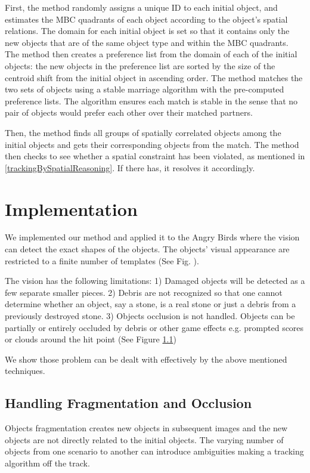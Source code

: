 \documentclass[letterpaper]{article}
\begin{document}
First, the method randomly assigns a unique ID to each initial object, and estimates the MBC quadrants of each object according to the object's spatial relations. The domain for each initial object is set so that it contains only the new objects that are of the same object type and within the MBC quadrants. The method then creates a preference list from the domain of each of the initial objects: the new objects in the preference list are sorted by the size of the centroid shift from the initial object in ascending order. The method matches the two sets of objects using a stable marriage algorithm with the pre-computed preference lists. The algorithm ensures each match is stable in the sense that no pair of objects would prefer each other over their matched partners. 

Then, the method finds all groups of spatially correlated objects among the initial objects and gets their corresponding objects from the match. The method then checks to see whether a spatial constraint has been violated, as mentioned in \ref{trackingBySpatialReasoning}. If there has, it resolves it accordingly.

 

\section{Implementation}
We implemented our method and applied it to the Angry Birds where the vision can detect the exact shapes of the objects\cite{}. The objects' visual appearance are restricted to a finite number of templates (See Fig. ).

The vision has the following limitations: 1) Damaged objects will be detected as a few separate smaller pieces. 2) Debris are not recognized so that one cannot determine whether an object, say a stone, is a real stone or just a debris from a previously destroyed stone. 3) Objects occlusion is not handled. Objects can be partially or entirely occluded by debris or other game effects e.g. prompted scores or clouds around the hit point (See Figure \ref{})

We show those problem can be dealt with effectively by the above mentioned techniques.

\subsection{Handling Fragmentation and Occlusion}

Objects fragmentation creates new objects in subsequent images and the new objects are not directly related to the initial objects. The varying number of objects from one scenario to another can introduce ambiguities making a tracking algorithm off the track. 
\end{document}
